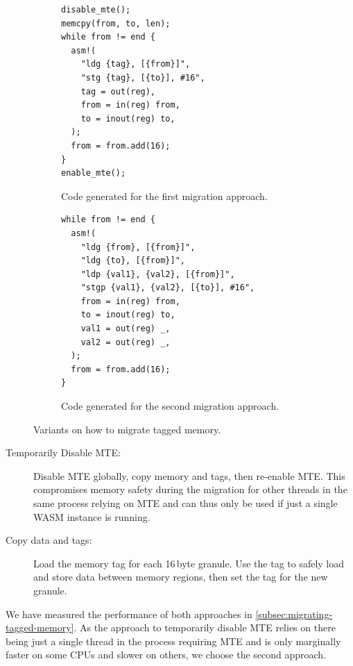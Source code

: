 \begin{figure}[h]
  \centering
  \begin{subfigure}[T]{0.45\textwidth}
    \centering
    \begin{lstlisting}[frame=h,style=customc,label={lst:migrating-memory-disable}]
disable_mte();
memcpy(from, to, len);
while from != end {
  asm!(
    "ldg {tag}, [{from}]",
    "stg {tag}, [{to}], #16",
    tag = out(reg),
    from = in(reg) from,
    to = inout(reg) to,
  );
  from = from.add(16);
}
enable_mte();
    \end{lstlisting}
    \caption{Code generated for the first migration approach.}
    \label{fig:migrating-memory-disable}
  \end{subfigure}
  \hfill
  \begin{subfigure}[T]{0.45\textwidth}
    \centering
    \begin{lstlisting}[frame=h,style=customc,label={lst:migrating-memory-tags}]
while from != end {
  asm!(
    "ldg {from}, [{from}]",
    "ldg {to}, [{from}]",
    "ldp {val1}, {val2}, [{from}]",
    "stgp {val1}, {val2}, [{to}], #16",
    from = in(reg) from,
    to = inout(reg) to,
    val1 = out(reg) _,
    val2 = out(reg) _,
  );
  from = from.add(16);
}
    \end{lstlisting}
    \caption{Code generated for the second migration approach.}
    \label{fig:migrating-memory-tags}
  \end{subfigure}
  \caption{Variants on how to migrate tagged memory.}
  \label{fig:migrating-memory}
\end{figure}

\begin{description}
  \item[Temporarily Disable \ac{MTE}:]
  Disable \ac{MTE} globally, copy memory and tags, then re-enable \ac{MTE}.
  This compromises memory safety during the migration for other threads in the same process relying on \ac{MTE} and can thus only be used if just a single \ac{WASM} instance is running.

  \item[Copy data and tags:]
  Load the memory tag for each 16\,byte granule.
  Use the tag to safely load and store data between memory regions, then set the tag for the new granule.

\end{description}

\noindent
We have measured the performance of both approaches in \cref{subsec:migrating-tagged-memory}.
As the approach to temporarily disable \ac{MTE} relies on there being just a single thread in the process requiring \ac{MTE} and is only marginally faster on some CPUs and slower on others, we choose the second approach.

